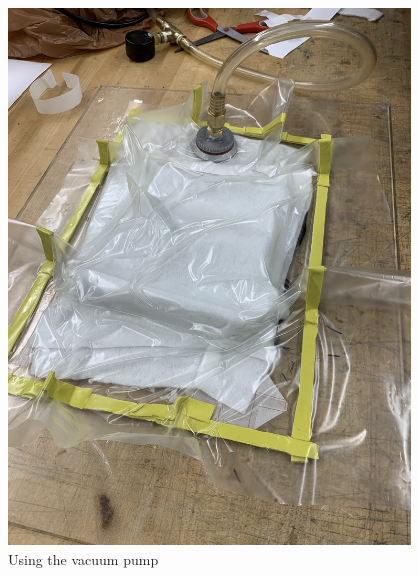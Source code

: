 \begin{figure}[ht]
\begin{minipage}[b]{.48\textwidth}
  \includegraphics[width=0.95\textwidth]{Meetings/December/12-19-21/12-19-21_Hardware_Figure4 - Nathan Forrer.JPG}
  \caption{Using the vacuum pump}
  \label{fig:121921_4}
\end{minipage}
\end{figure}

